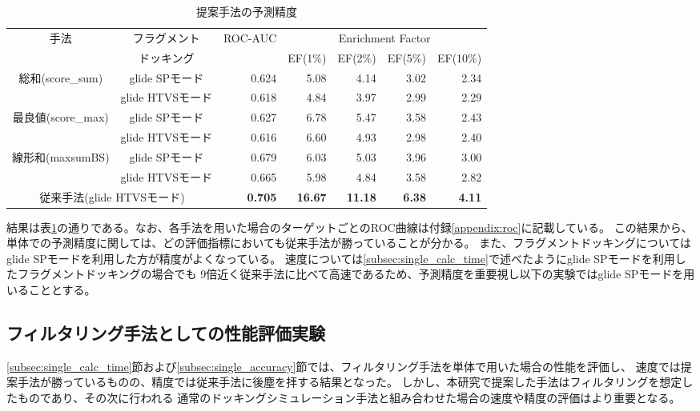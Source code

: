 \begin{table}[htb] \centering
	\caption{提案手法の予測精度}
	\label{table:single_accuracy}
	\begin{tabular}{c|c|rrrrr|}
	\multirow{2}{*}{手法}				&フラグメント		&\multirow{2}{*}{ROC-AUC}	&\multicolumn{4}{c|}{Enrichment Factor}	\\
									&ドッキング		&						&EF(1\%)		&EF(2\%)		&EF(5\%)		&EF(10\%)	\\ \hline
	\multirow{2}{*}{総和(score\_sum)}		&glide SPモード	&0.624					&5.08		&4.14		&3.02		&2.34		\\
									&glide HTVSモード	&0.618					&4.84		&3.97		&2.99		&2.29		\\
	\multirow{2}{*}{最良値(score\_max)}	&glide SPモード	&0.627					&6.78		&5.47		&3.58		&2.43		\\
									&glide HTVSモード	&0.616					&6.60		&4.93		&2.98		&2.40		\\
	\multirow{2}{*}{線形和(maxsumBS)}	&glide SPモード	&0.679					&6.03		&5.03		&3.96		&3.00		\\
									&glide HTVSモード	&0.665					&5.98		&4.84		&3.58		&2.82		\\ \hline
	\multicolumn{2}{c|}{従来手法(glide HTVSモード)}			&{\bf 0.705}				&{\bf 16.67}	&{\bf 11.18}	&{\bf 6.38}	&{\bf 4.11}	\\ \hline
	\end{tabular}
\end{table}

結果は表\ref{table:single_accuracy}の通りである。なお、各手法を用いた場合のターゲットごとのROC曲線は付録\ref{appendix:roc}に記載している。
この結果から、単体での予測精度に関しては、どの評価指標においても従来手法が勝っていることが分かる。
また、フラグメントドッキングについてはglide SPモードを利用した方が精度がよくなっている。
速度については\ref{subsec:single_calc_time}で述べたようにglide SPモードを利用したフラグメントドッキングの場合でも
9倍近く従来手法に比べて高速であるため、予測精度を重要視し以下の実験ではglide SPモードを用いることとする。

\subsection{フィルタリング手法としての性能評価実験}
\ref{subsec:single_calc_time}節および\ref{subsec:single_accuracy}節では、フィルタリング手法を単体で用いた場合の性能を評価し、
速度では提案手法が勝っているものの、精度では従来手法に後塵を拝する結果となった。
しかし、本研究で提案した手法はフィルタリングを想定したものであり、その次に行われる
通常のドッキングシミュレーション手法と組み合わせた場合の速度や精度の評価はより重要となる。

